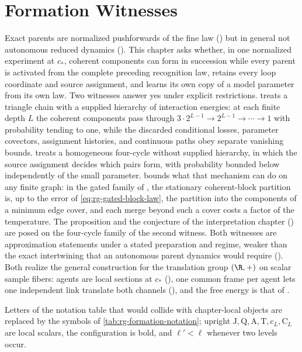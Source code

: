 \chapter{Formation Witnesses}
\label{ch:finite-depth-formation}

Exact parents are normalized pushforwards of the fine law
() but in general not autonomous reduced
dynamics (). This chapter asks whether, in one
normalized experiment at \(c_*\), coherent components can form in succession
while every parent is activated from the complete preceding recognition law,
retains every loop coordinate and source assignment, and learns its own copy
of a model parameter from its own law. Two witnesses answer yes under
explicit restrictions.  treats a
triangle chain with a supplied hierarchy of interaction energies: at each
finite depth \(L\) the coherent components pass through
\(3\cdot2^{L-1}\to2^{L-1}\to\cdots\to1\) with probability tending to one,
while the discarded conditional losses, parameter covectors, assignment
histories, and continuous paths obey separate vanishing bounds.
 treats a homogeneous four-cycle
without supplied hierarchy, in which the source assignment decides which
pairs form, with probability bounded below independently of the small
parameter.  bounds what that mechanism can do
on any finite graph: in the gated family of
, the stationary coherent-block
partition is, up to the error of \cref{eq:rg-gated-block-law}, the
partition into the components of a minimum edge cover, and each merge
beyond such a cover costs a factor of the temperature. The proposition and
the conjecture of
the interpretation
chapter ()
are posed on the four-cycle family of the second witness. Both witnesses are
approximation statements under a stated preparation and regime, weaker than
the exact intertwining that an autonomous parent dynamics would require
(). Both realize the general
construction for the translation group \((\R,+)\) on scalar sample fibers:
agents are local sections at \(c_*\) (), one common frame
per agent lets one independent link translate both channels
(), and the free energy is that of
.

Letters of the notation table that would collide with chapter-local objects
are replaced by the symbols of \cref{tab:rg-formation-notation}; upright
\(\mathrm J,\mathrm Q,\mathrm A,\mathrm T,\mathrm c_L,\mathrm C_L\) are local
scalars, the configuration is bold, and \(\ell'<\ell\) whenever two levels
occur.


